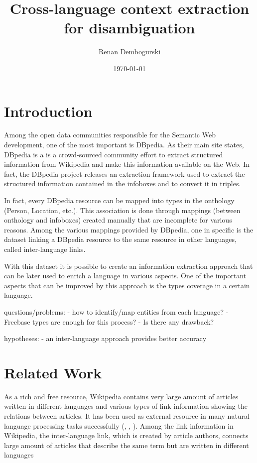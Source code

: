 \documentclass[10pt,a4paper]{llncs}
\title{Cross-language context extraction for disambiguation}
\author{Renan Dembogurski}
\date{\today}
\begin{document}
\maketitle

\begin{abstract}
\end{abstract}

\section{Introduction}

Among the open data communities responsible for the Semantic Web development, one of the most important is DBpedia. As their main site states, DBpedia is a is a crowd-sourced community effort to extract structured information from Wikipedia and make this information available on the Web. In fact, the DBpedia project releases an extraction framework used to extract the structured information contained in the infoboxes and to convert it in triples. 

In fact, every DBpedia resource can be mapped into types in the onthology (Person, Location, etc.). This association is done through mappings (between onthology and infoboxes) created manually that are incomplete for various reasons. Among the various mappings provided by DBpedia, one in specific is the dataset linking a DBpedia resource to the same resource in other languages, called inter-language links.

With this dataset it is possible to create an information extraction approach that can be later used to enrich a language in various aspects. One of the important aspects that can be improved by this approach is the types coverage in a certain language.

questions/problems: 
- how to identify/map entities from each language?
- Freebase types are enough for this process?
- Is there any drawback?

hypotheses:
-  an inter-language approach provides better accuracy

\section{Related Work}

As a rich and free resource, Wikipedia contains very large amount of articles written in different languages and various types of link information showing the relations between articles. It has been used as external resource in many natural language processing tasks successfully (\cite{buscaldi_rosso}, \cite{mihalcea}, \cite{erdmann}). 
Among the link information in Wikipedia, the inter-language link, which is created by article authors, connects large amount of articles that describe the same term but are written in different languages
\end{document}
